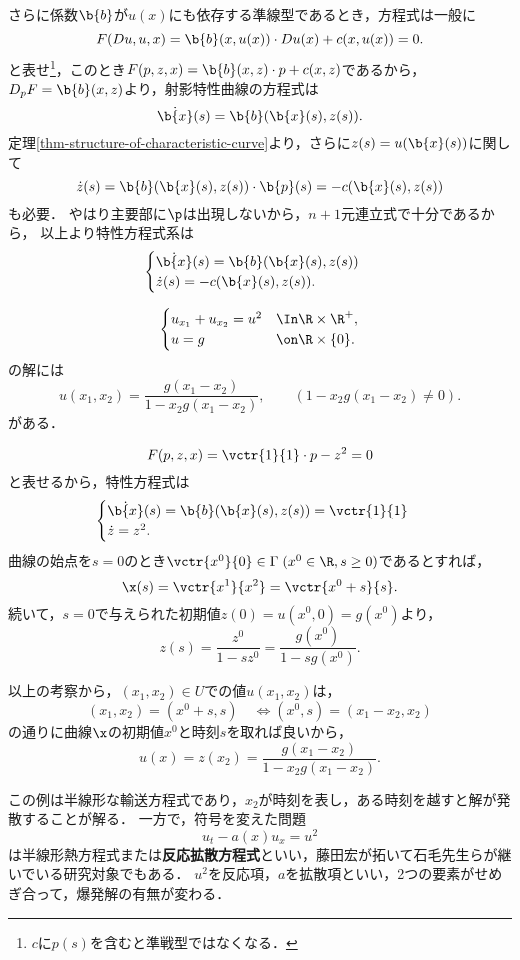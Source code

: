 \documentclass[uplatex,dvipdfmx]{jsreport}
\begin{document}
\begin{problem}[準線型PDEの特性方程式系]\label{prob-1st-order-quasi-linear-PDE}
    さらに係数$\b{b}$が$u(x)$にも依存する準線型であるとき，方程式は一般に
    \[F(Du,u,x)=\b{b}(x,u(x))\cdot Du(x)+c(x,u(x))=0.\]
    と表せ\footnote{$c$に$p(s)$を含むと準戦型ではなくなる．}，このとき$F(p,z,x)=\b{b}(x,z)\cdot p+c(x,z)$であるから，$D_pF=\b{b}(x,z)$より，射影特性曲線の方程式は
    \[\dot{\b{x}}(s)=\b{b}(\b{x}(s),z(s)).\]
    定理\ref{thm-structure-of-characteristic-curve}より，さらに$z(s)=u(\b{x}(s))$に関して
    \[\dot{z}(s)=\b{b}(\b{x}(s),z(s))\cdot\b{p}(s)=-c(\b{x}(s),z(s))\]
    も必要．
    やはり主要部に$\p$は出現しないから，$n+1$元連立式で十分であるから，
    以上より特性方程式系は
    \[\begin{cases}
        \dot{\b{x}}(s)=\b{b}(\b{x}(s),z(s))\\
        \dot{z}(s)=-c(\b{x}(s),z(s)).
    \end{cases}\]
\end{problem}

\begin{example}[特性方程式が解ける準線型PDEの例]
    \[\begin{cases}
        u_{x_1}+u_{x_2}=u^2&\In \R\times\R^+,\\
        u=g&\on\R\times\{0\}.
    \end{cases}\]
    の解には
    \[u(x_1,x_2)=\frac{g(x_1-x_2)}{1-x_2g(x_1-x_2)},\qquad(1-x_2g(x_1-x_2)\ne0).\]
    がある．
\end{example}
\begin{Proof}
    \[F(p,z,x)=\vctr{1}{1}\cdot p-z^2=0\]
    と表せるから，特性方程式は
    \[\begin{cases}
        \dot{\b{x}}(s)=\b{b}(\b{x}(s),z(s))=\vctr{1}{1}\\
        \dot{z}=z^2.
    \end{cases}\]
    曲線の始点を$s=0$のとき$\vctr{x^0}{0}\in\Gamma\;(x^0\in\R,s\ge0)$であるとすれば，
    \[\x(s)=\vctr{x^1}{x^2}=\vctr{x^0+s}{s}.\]
    続いて，$s=0$で与えられた初期値$z(0)=u(x^0,0)=g(x^0)$より，
    \[z(s)=\frac{z^0}{1-sz^0}=\frac{g(x^0)}{1-sg(x^0)}.\]

    以上の考察から，$(x_1,x_2)\in U$での値$u(x_1,x_2)$は，
    \[(x_1,x_2)=(x^0+s,s)\quad\Leftrightarrow (x^0,s)=(x_1-x_2,x_2)\]
    の通りに曲線$\x$の初期値$x^0$と時刻$s$を取れば良いから，
    \[u(x)=z(x_2)=\frac{g(x_1-x_2)}{1-x_2g(x_1-x_2)}.\]
\end{Proof}
\begin{remarks}[半線形輸送の奥深さ]
    この例は半線形な輸送方程式であり，$x_2$が時刻を表し，ある時刻を越すと解が発散することが解る．
    一方で，符号を変えた問題
    \[u_t-a(x)u_x=u^2\]
    は半線形熱方程式または\textbf{反応拡散方程式}といい，藤田宏が拓いて石毛先生らが継いでいる研究対象でもある．
    $u^2$を反応項，$a$を拡散項といい，2つの要素がせめぎ合って，爆発解の有無が変わる．
\end{remarks}
\end{document}
